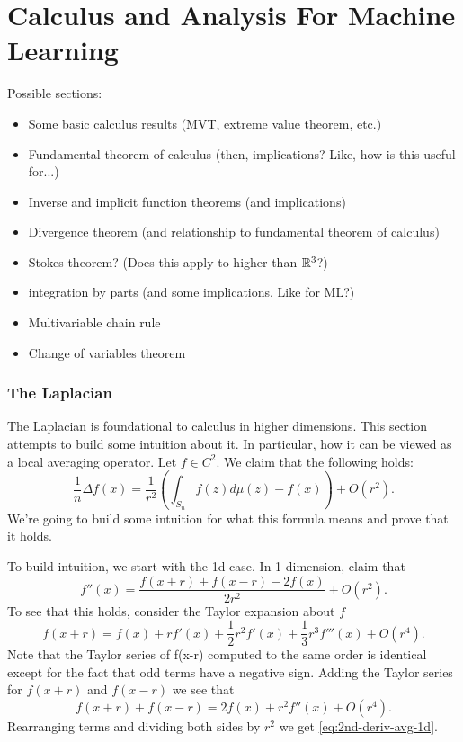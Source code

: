 \chapter{Calculus and Analysis For Machine Learning}

Possible sections:
\begin{itemize}
  \item Some basic calculus results (MVT, extreme value theorem, etc.) 
  \item Fundamental theorem of calculus (then, implications? Like, how is this useful for...)
  \item Inverse and implicit function theorems (and implications) 
  \item Divergence theorem (and relationship to fundamental theorem of calculus)
  \item Stokes theorem? (Does this apply to higher than $\mathbb{R}^3$?) 
  \item integration by parts (and some implications. Like for ML?) 
  \item Multivariable chain rule
  \item Change of variables theorem
\end{itemize}


\subsection{The Laplacian}
The Laplacian is foundational to calculus in higher dimensions. This section attempts to build some intuition about it. In particular, how it can be viewed as a local averaging operator. Let $f\in C^2$. We claim that the following holds:
\begin{equation} \label{eq:laplace-local-average}
\frac{1}{n} \Delta f(x) = \frac{1}{r^2}\left(\int_{S_n} f(z) d\mu(z) - f(x) \right) + O(r^2). 
\end{equation}
We're going to build some intuition for what this formula means and prove that it holds. 

To build intuition, we start with the 1d case. In 1 dimension, claim that
\begin{equation} \label{eq:2nd-deriv-avg-1d}
f''(x) = \frac{f(x+r) + f(x-r) - 2f(x) }{2r^2} + O(r^2). 
\end{equation}
To see that this holds, consider the Taylor expansion about $f$
$$
f(x+r) = f(x) + rf'(x) + \frac{1}{2}r^2 f'(x) + \frac{1}{3}r^3 f'''(x) + O(r^4).
$$
Note that the Taylor series of f(x-r) computed to the same order is identical except for the fact that odd terms have a negative sign. Adding the Taylor series for $f(x+r)$ and $f(x-r)$ we see that
$$
f(x+r) + f(x-r) = 2f(x) + r^2f''(x) + O(r^4). 
$$
Rearranging terms and dividing both sides by $r^2$ we get \eqref{eq:2nd-deriv-avg-1d}. 

